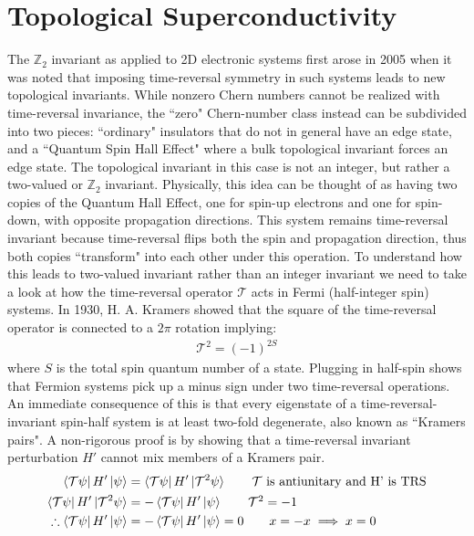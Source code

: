 \section{Topological Superconductivity}
The $\mathbb{Z}_{2}$ invariant as applied to 2D electronic systems first arose in 2005 when it was noted that imposing time-reversal symmetry in such systems leads to new topological invariants\cite{Kane2005, Onoda2002, Shuichi_Murakami_2007}. While nonzero Chern numbers cannot be realized with time-reversal invariance, the ``zero" Chern-number class instead can be subdivided into two pieces: ``ordinary" insulators that do not in general have an edge state, and a ``Quantum Spin Hall Effect" where a bulk topological invariant forces an edge state. The topological invariant in this case is not an integer, but rather a two-valued or $\mathbb{Z}_{2}$ invariant. Physically, this idea can be thought of as having two copies of the Quantum Hall Effect, one for spin-up electrons and one for spin-down, with opposite propagation directions. This system remains time-reversal invariant because time-reversal flips both the spin and propagation direction, thus both copies ``transform" into each other under this operation. To understand how this leads to two-valued invariant rather than an integer invariant we need to take a look at how the time-reversal operator $\mathcal{T}$ acts in Fermi (half-integer spin) systems. In 1930, H. A. Kramers showed that the square of the time-reversal operator is connected to a $2\pi$ rotation implying:
\begin{align}
	\mathcal{T}^{2} = (-1)^{2S}
\end{align}
where $S$ is the total spin quantum number of a state\cite{Kramers1930}. Plugging in half-spin shows that Fermion systems pick up a minus sign under two time-reversal operations. An immediate consequence of this is that every eigenstate of a time-reversal-invariant spin-half system is at least two-fold degenerate, also known as ``Kramers pairs". A non-rigorous proof is by showing that a time-reversal invariant perturbation $H'$ cannot mix members of a Kramers pair.
\begin{align}
	\bra{\mathcal{T}\psi}H'\ket{\psi} &= \bra{\mathcal{T}\psi}H'\ket{\mathcal{T}^{2}\psi} \tag*{$\mathcal{T}$ is antiunitary and H' is TRS}\\
	\bra{\mathcal{T}\psi}H'\ket{\mathcal{T}^{2}\psi} &= -\bra{\mathcal{T}\psi}H'\ket{\psi} \tag*{$\mathcal{T}^{2} = -1$}\\
	\therefore \bra{\mathcal{T}\psi}H'\ket{\psi} &= -\bra{\mathcal{T}\psi}H'\ket{\psi} = 0
	\tag*{$x = -x \implies x = 0$}
\end{align}
